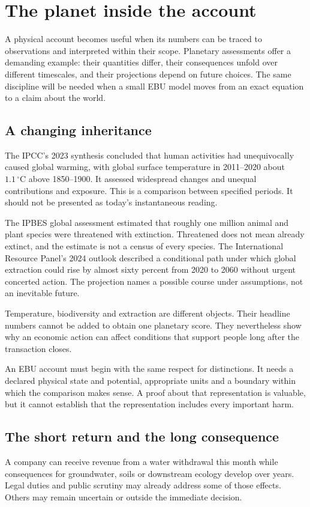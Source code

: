 \chapter{The planet inside the account}\label{ch:planet}

A physical account becomes useful when its numbers can be traced to observations and interpreted within their scope. Planetary assessments offer a demanding example: their quantities differ, their consequences unfold over different timescales, and their projections depend on future choices. The same discipline will be needed when a small EBU model moves from an exact equation to a claim about the world.

\section{A changing inheritance}
The IPCC's 2023 synthesis concluded that human activities had unequivocally caused global warming, with global surface temperature in 2011--2020 about $1.1\,^\circ\mathrm{C}$ above 1850--1900. It assessed widespread changes and unequal contributions and exposure.\cite{intro-ipcc} This is a comparison between specified periods. It should not be presented as today's instantaneous reading.

The IPBES global assessment estimated that roughly one million animal and plant species were threatened with extinction. Threatened does not mean already extinct, and the estimate is not a census of every species.\cite{intro-ipbes} The International Resource Panel's 2024 outlook described a conditional path under which global extraction could rise by almost sixty percent from 2020 to 2060 without urgent concerted action.\cite{intro-resources} The projection names a possible course under assumptions, not an inevitable future.

Temperature, biodiversity and extraction are different objects. Their headline numbers cannot be added to obtain one planetary score. They nevertheless show why an economic action can affect conditions that support people long after the transaction closes.

An EBU account must begin with the same respect for distinctions. It needs a declared physical state and potential, appropriate units and a boundary within which the comparison makes sense. A proof about that representation is valuable, but it cannot establish that the representation includes every important harm.

\section{The short return and the long consequence}
A company can receive revenue from a water withdrawal this month while consequences for groundwater, soils or downstream ecology develop over years. Legal duties and public scrutiny may already address some of those effects. Others may remain uncertain or outside the immediate decision.

